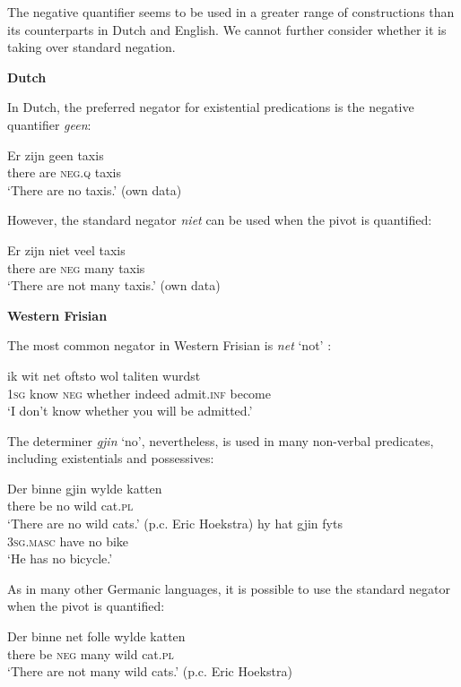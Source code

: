 ﻿\documentclass[output=paper]{langsci/langscibook}
\begin{document}
\begin{unindented}
The negative quantifier seems to be used in a greater range of constructions than its counterparts in Dutch and English. We cannot further consider  whether it is taking over standard negation. 

\textbf{Dutch} 

In Dutch, the preferred negator for existential predications is the negative quantifier \textit{geen}: 
%
\begin{exe}\ex \gll Er zijn geen   taxis \\
there are \textsc{neg.q} taxis \\
    \glt `There are no taxis.' (own data)
    \end{exe}

However, the standard negator \textit{niet} can be used when the pivot is quantified:
%
\begin{exe}\ex \gll Er zijn niet  veel   taxis \\
there are  \textsc{neg} many taxis \\
    \glt `There are not many taxis.' (own data)
    \end{exe}

\textbf{Western Frisian}

The most common negator in Western Frisian is \textit{net} `not' \citep[102--103]{Tiersma1999}:
%
\begin{exe}\ex \gll ik wit net  oftsto wol taliten wurdst \\
\textsc{1sg} know \textsc{neg} whether indeed admit.\textsc{inf} become \\
    \glt `I don't know whether you will be admitted.' \citep[91]{Tiersma1999}
    \end{exe}

The determiner \textit{gjin} `no', nevertheless, is used in many non-verbal predicates, including existentials and possessives:
%
\begin{exe}\ex \gll Der binne gjin wylde katten \\
there be no wild cat.\textsc{pl}
        \\
    \glt `There are no wild cats.' (p.c. Eric Hoekstra) 
\ex \gll hy hat gjin fyts \\
\textsc{3sg.masc} have no   bike \\
    \glt `He has no bicycle.' \citep[102]{Tiersma1999}
    \end{exe}

As in many other Germanic languages, it is possible to use the standard negator when the pivot is quantified:
%
\begin{exe}\ex \gll Der   binne net   folle  wylde katten \\
there be \textsc{neg} many wild   cat.\textsc{pl} \\
    \glt `There are not many wild cats.' (p.c. Eric Hoekstra)
    \end{exe}


\end{unindented}
\end{document}

